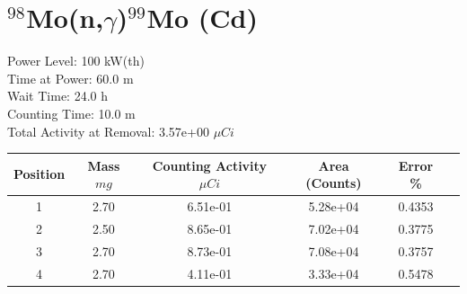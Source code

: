 \newpage

\section*{ $^{98}$Mo(n,$\gamma$)$^{99}$Mo (Cd) }

Power Level: 100 kW(th) \\
Time at Power: 60.0 m \\
Wait Time: 24.0 h \\
Counting Time: 10.0 m \\
Total Activity at Removal: 3.57e+00 $\mu Ci$

\begin{table}[h]
\centering
\begin{tabular}{ |c|c|c|c|c|c| }
 \hline
 Position & Mass $mg$ & Counting Activity $\mu Ci$ & Area (Counts) & Error \% \\
 \hline 
 1 & 2.70 & 6.51e-01 & 5.28e+04 & 0.4353 \\ 
\hline
 2 & 2.50 & 8.65e-01 & 7.02e+04 & 0.3775 \\ 
\hline
 3 & 2.70 & 8.73e-01 & 7.08e+04 & 0.3757 \\ 
\hline
 4 & 2.70 & 4.11e-01 & 3.33e+04 & 0.5478 \\ 
\hline
\end{tabular}
\end{table}

